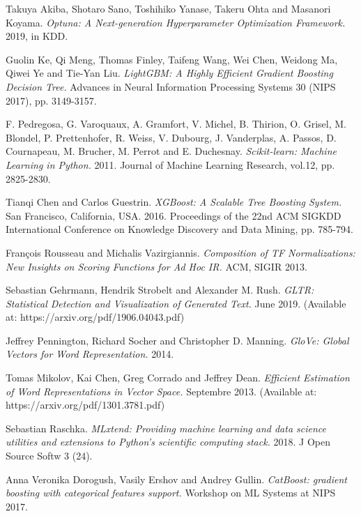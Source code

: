 \documentclass{article}
\begin{document}
\begin{multicols}{2}

\begin{thebibliography}{9}

Takuya Akiba, Shotaro Sano, Toshihiko Yanase, Takeru Ohta and Masanori Koyama.
\textit{Optuna: A Next-generation Hyperparameter Optimization Framework.} 2019, in KDD.

Guolin Ke, Qi Meng, Thomas Finley, Taifeng Wang, Wei Chen, Weidong Ma, Qiwei Ye and Tie-Yan Liu.
\textit{LightGBM: A Highly Efficient Gradient Boosting Decision Tree.} Advances in Neural
Information Processing Systems 30 (NIPS 2017), pp. 3149-3157.

F. Pedregosa, G. Varoquaux, A. Gramfort, V. Michel, B. Thirion, O. Grisel, M. Blondel,
P. Prettenhofer, R. Weiss, V. Dubourg, J. Vanderplas, A. Passos, D. Cournapeau, M. Brucher,
M. Perrot and E. Duchesnay. \textit{Scikit-learn: Machine Learning in Python.} 2011. Journal
of Machine Learning Research, vol.12, pp. 2825-2830.

Tianqi Chen and Carlos Guestrin. \textit{XGBoost: A Scalable Tree Boosting System.}
San Francisco, California, USA. 2016. Proceedings of the 22nd ACM SIGKDD International
Conference on Knowledge Discovery and Data Mining, pp. 785-794.

François Rousseau and Michalis Vazirgiannis. \textit{Composition of TF Normalizations: New Insights on Scoring Functions for Ad Hoc IR.} ACM, SIGIR 2013.

Sebastian Gehrmann, Hendrik Strobelt and Alexander M. Rush. \textit{GLTR: Statistical Detection and Visualization of Generated Text.} June 2019. (Available at: https://arxiv.org/pdf/1906.04043.pdf)

Jeffrey Pennington, Richard Socher and Christopher D. Manning. \textit{GloVe: Global Vectors for Word Representation.} 2014.

Tomas Mikolov, Kai Chen, Greg Corrado and Jeffrey Dean. \textit{Efficient Estimation of Word Representations in Vector Space.} Septembre 2013. (Available at: https://arxiv.org/pdf/1301.3781.pdf)

Sebastian Raschka. \textit{MLxtend: Providing machine learning and data science utilities and extensions to Python's scientific computing stack.} 2018. J Open Source Softw 3 (24). 

Anna Veronika Dorogush, Vasily Ershov and Andrey Gullin. \textit{CatBoost: gradient boosting with categorical features support.} Workshop on ML Systems at NIPS 2017.

\end{thebibliography}

\end{multicols}
\end{document}
